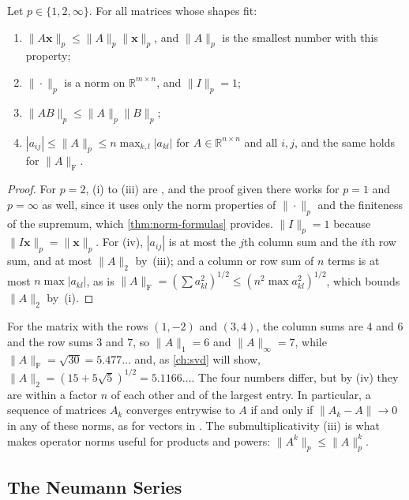 \begin{proposition}
\label{prop:operator-norms}
Let $p\in\{1,2,\infty\}$. For all matrices whose shapes fit:
\begin{enumerate}
\item $\|A\mathbf x\|_p\le\|A\|_p\|\mathbf x\|_p$, and $\|A\|_p$ is the smallest number with this property;
\item $\|\cdot\|_p$ is a norm on $\mathbb R^{m\times n}$, and $\|I\|_p=1$;
\item $\|AB\|_p\le\|A\|_p\|B\|_p$;
\item $|a_{ij}|\le\|A\|_p\le n\max_{k,l}|a_{kl}|$ for $A\in\mathbb R^{n\times n}$ and all $i,j$, and the same holds for $\|A\|_{\mathrm F}$.
\end{enumerate}
\end{proposition}

\begin{proof}
For $p=2$, (i) to (iii) are , and the proof given there works for $p=1$ and $p=\infty$ as well, since it uses only the norm properties of $\|\cdot\|_p$ and the finiteness of the supremum, which \cref{thm:norm-formulas} provides. $\|I\|_p=1$ because $\|I\mathbf x\|_p=\|\mathbf x\|_p$. For (iv), $|a_{ij}|$ is at most the $j$th column sum and the $i$th row sum, and at most $\|A\|_2$ by \,(iii); and a column or row sum of $n$ terms is at most $n\max|a_{kl}|$, as is $\|A\|_{\mathrm F}=(\sum a_{kl}^2)^{1/2}\le(n^2\max a_{kl}^2)^{1/2}$, which bounds $\|A\|_2$ by \,(i).
\end{proof}

For the matrix with the rows $(1,-2)$ and $(3,4)$, the column sums are $4$ and $6$ and the row sums $3$ and $7$, so $\|A\|_1=6$ and $\|A\|_\infty=7$, while $\|A\|_{\mathrm F}=\sqrt{30}=5.477\ldots$ and, as \cref{ch:svd} will show, $\|A\|_2=(15+5\sqrt5)^{1/2}=5.1166\ldots$. The four numbers differ, but by (iv) they are within a factor $n$ of each other and of the largest entry. In particular, a sequence of matrices $A_k$ converges entrywise to $A$ if and only if $\|A_k-A\|\to0$ in any of these norms, as for vectors in . The submultiplicativity (iii) is what makes operator norms useful for products and powers: $\|A^k\|_p\le\|A\|_p^k$.

\subsection{The Neumann Series}

